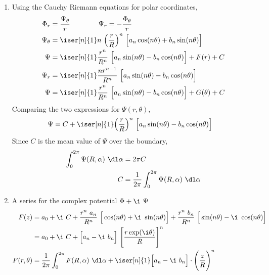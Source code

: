 \begin{enumerate}
\begin{enumerate}
              \item Using the Cauchy Riemann equations for polar coordinates,
                    \begin{align}
                        \Phi_r      & = \frac{\Psi_\theta}{r} \qquad\qquad
                        \Psi_r = -\frac{\Phi_\theta}{r}                          \\
                        \Psi_\theta & = \iser[n]{1} n\ \Big( \frac{r}{R} \Big)^n
                        \ \Big[ a_n \cos(n\theta) + b_n \sin(n\theta) \Big]      \\
                        \Psi        & = \iser[n]{1} \frac{r^{n}}{R^n}\ \Big[
                        a_n \sin(n\theta) - b_n \cos(n\theta) \Big] + F(r) + C   \\
                        \Psi_r      & = \iser[n]{1} \frac{nr^{n-1}}{R^n}\ \Big[
                        a_n \sin(n\theta) - b_n \cos(n\theta) \Big]              \\
                        \Psi        & = \iser[n]{1} \frac{r^{n}}{R^n}\ \Big[
                            a_n \sin(n\theta) - b_n \cos(n\theta) \Big] + G(\theta) + C
                    \end{align}
                    Comparing the two expressions for $ \Psi(r, \theta) $,
                    \begin{align}
                        \Psi & = C + \iser[n]{1} \Big( \frac{r}{R} \Big)^n
                        \ \Big[ a_n \sin(n\theta) - b_n\cos(n\theta) \Big]
                    \end{align}
                    Since $ C $ is the mean value of $ \Psi $ over the boundary,
                    \begin{align}
                        \int_{0}^{2\pi} \Psi(R, \alpha)\ \dl \alpha
                          & = 2\pi C                                         \\
                        C & = \frac{1}{2\pi} \int_{0}^{2\pi} \Psi(R, \alpha)
                        \ \dl \alpha
                    \end{align}

              \item A series for the complex potential $ \Phi + \i\ \Psi $
                    \begin{align}
                        F(z)         & = a_0 + \i\ C + \frac{r^n\ a_n}{R^n}\ \Big[
                            \cos(n\theta) + \i\ \sin(n\theta) \Big] +
                        \frac{r^n\ b_n}{R^n}\ \Big[
                        \sin(n\theta) - \i\ \cos(n\theta) \Big]                    \\
                                     & = a_0 + \i\ C + \Big[a_n - \i\ b_n\Big]
                        \ \Bigg[\frac{r \exp(\i \theta)}{R}  \Bigg]^n              \\
                        F(r, \theta) & = \frac{1}{2\pi} \int_{0}^{2\pi}
                        F(R, \alpha)\ \dl \alpha + \iser[n]{1} \Big[a_n - \i\ b_n
                            \Big] \cdot \Bigg( \frac{z}{R} \Bigg)^n
                    \end{align}
          \end{enumerate}
\end{enumerate}